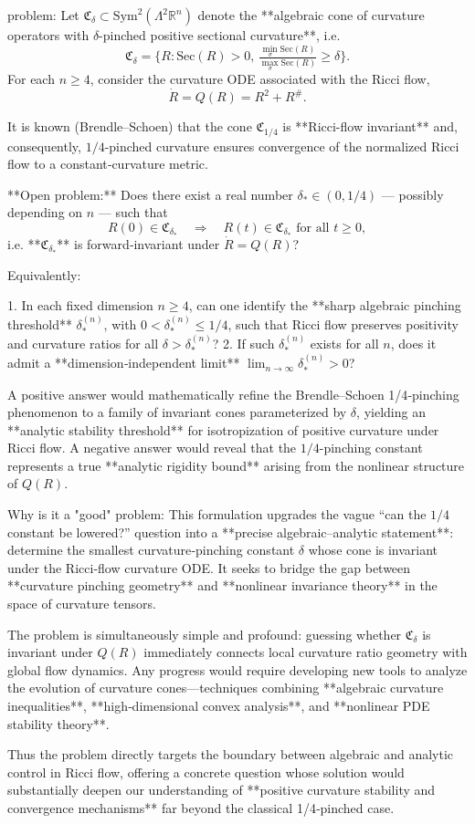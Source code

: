 problem:  
Let \( \mathfrak{C}_{\delta} \subset \mathrm{Sym}^2(\Lambda^2\mathbb{R}^n) \) denote the **algebraic cone of curvature operators with \(\delta\)-pinched positive sectional curvature**, i.e.  
\[
\mathfrak{C}_{\delta} = \{ R : \mathrm{Sec}(R)>0,\, \tfrac{\min_{\sigma}\mathrm{Sec}(R)}{\max_{\sigma}\mathrm{Sec}(R)} \ge \delta \}.
\]  
For each \(n \ge 4\), consider the curvature ODE associated with the Ricci flow,  
\[
\dot R = Q(R) = R^2 + R^{\#}.
\]

It is known (Brendle–Schoen) that the cone \(\mathfrak{C}_{1/4}\) is **Ricci-flow invariant** and, consequently, \(1/4\)-pinched curvature ensures convergence of the normalized Ricci flow to a constant‑curvature metric.  

**Open problem:**  
Does there exist a real number \( \delta_* \in (0,1/4) \) — possibly depending on \( n \) — such that  
\[
R(0)\in \mathfrak{C}_{\delta_*} \quad \Rightarrow \quad R(t)\in \mathfrak{C}_{\delta_*}\text{ for all }t\ge0,
\]
i.e. **\(\mathfrak{C}_{\delta_*}\)** is forward‑invariant under \( \dot R = Q(R)\)?  

Equivalently:  

1. In each fixed dimension \(n\ge4\), can one identify the **sharp algebraic pinching threshold** \( \delta_*^{(n)} \), with \(0 < \delta_*^{(n)} \le 1/4\), such that Ricci flow preserves positivity and curvature ratios for all \( \delta > \delta_*^{(n)} \)?  
2. If such \( \delta_*^{(n)} \) exists for all \(n\), does it admit a **dimension‑independent limit** \( \lim_{n\to\infty} \delta_*^{(n)} > 0 \)?  

A positive answer would mathematically refine the Brendle–Schoen 1/4‑pinching phenomenon to a family of invariant cones parameterized by \( \delta \), yielding an **analytic stability threshold** for isotropization of positive curvature under Ricci flow.  
A negative answer would reveal that the \(1/4\)-pinching constant represents a true **analytic rigidity bound** arising from the nonlinear structure of \( Q(R) \).

Why is it a "good" problem:  
This formulation upgrades the vague “can the \(1/4\) constant be lowered?” question into a **precise algebraic–analytic statement**: determine the smallest curvature‑pinching constant \(\delta\) whose cone is invariant under the Ricci‑flow curvature ODE. It seeks to bridge the gap between **curvature pinching geometry** and **nonlinear invariance theory** in the space of curvature tensors.  

The problem is simultaneously simple and profound: guessing whether \(\mathfrak{C}_\delta\) is invariant under \(Q(R)\) immediately connects local curvature ratio geometry with global flow dynamics. Any progress would require developing new tools to analyze the evolution of curvature cones—techniques combining **algebraic curvature inequalities**, **high‑dimensional convex analysis**, and **nonlinear PDE stability theory**.  

Thus the problem directly targets the boundary between algebraic and analytic control in Ricci flow, offering a concrete question whose solution would substantially deepen our understanding of **positive curvature stability and convergence mechanisms** far beyond the classical 1/4‑pinched case.
